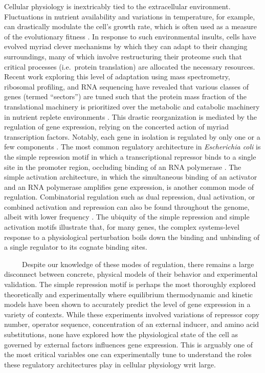 \documentclass[12pt]{caltech_thesis}
\begin{document}
Cellular physiology is inextricably tied to the extracellular
environment. Fluctuations in nutrient availability and variations in
temperature, for example, can drastically modulate the cell's growth
rate, which is often used as a measure of the evolutionary fitness
\autocite{schaechter1958}. In response to such environmental insults,
cells have evolved myriad clever mechanisms by which they can adapt to
their changing surroundings, many of which involve restructuring their
proteome such that critical processes (i.e.~protein translation) are
allocated the necessary resources. Recent work exploring this level of
adaptation using mass spectrometry, ribosomal profiling, and RNA
sequencing have revealed that various classes of genes (termed
``sectors'') are tuned such that the protein mass fraction of the
translational machinery is prioritized over the metabolic and catabolic
machinery in nutrient replete environments
\autocite{scott2014,klumpp2014,hui2015,schmidt2016,li2014}. This drastic
reorganization is mediated by the regulation of gene expression, relying
on the concerted action of myriad transcription factors. Notably, each
gene in isolation is regulated by only one or a few components
\autocite{gama-castro2016}. The most common regulatory architecture in
\emph{Escherichia coli} is the simple repression motif in which a
transcriptional repressor binds to a single site in the promoter region,
occluding binding of an RNA polymerase
\autocite{rydenfelt2014,phillips2019}. The simple activation
architecture, in which the simultaneous binding of an activator and an
RNA polymerase amplifies gene expression, is another common mode of
regulation. Combinatorial regulation such as dual repression, dual
activation, or combined activation and repression can also be found
throughout the genome, albeit with lower frequency
\autocite{phillips2019}. The ubiquity of the simple repression and
simple activation motifs illustrate that, for many genes, the complex
systems-level response to a physiological perturbation boils down the
binding and unbinding of a single regulator to its cognate binding
sites.

~~~~~Despite our knowledge of these modes of regulation, there remains a
large disconnect between concrete, physical models of their behavior and
experimental validation. The simple repression motif is perhaps the most
thoroughly explored theoretically and experimentally
\autocite{phillips2019} where equilibrium thermodynamic
\autocite{garcia2011,garcia2012,brewster2014,razo-mejia2018,barnes2019}
and kinetic \autocite{jones2014,ko1991,kepler2001,michel2010} models
have been shown to accurately predict the level of gene expression in a
variety of contexts. While these experiments involved variations of
repressor copy number, operator sequence, concentration of an external
inducer, and amino acid substitutions, none have explored how the
physiological state of the cell as governed by external factors
influences gene expression. This is arguably one of the most critical
variables one can experimentally tune to understand the roles these
regulatory architectures play in cellular physiology writ large.
\end{document}
